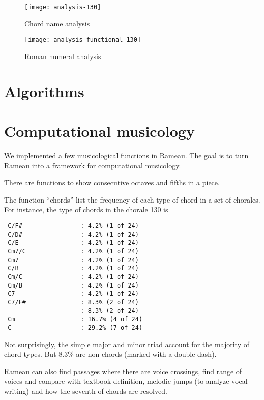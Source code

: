 \begin{figure}
  \centering
  \texttt{[image: analysis-130]}
  \caption{Chord name analysis}
  \label{fig:chord-name-analysis}
\end{figure}
\begin{figure}
  \centering
  \texttt{[image: analysis-functional-130]}  
  \caption{Roman numeral analysis}
  \label{fig:roman-analysis}
\end{figure}

\section{Algorithms}
\label{sec:algorithms}



\section{Computational musicology}
\label{sec:comp-music}


We implemented a few musicological functions in Rameau. The goal is to
turn Rameau into a framework for computational musicology. 

There are functions to show consecutive octaves and fifths in a piece.

The function ``chords'' list the frequency of each type of chord in a
set of chorales. For instance, the type of chords in the chorale 130
is

\begin{verbatim}
 C/F#                : 4.2% (1 of 24)
 C/D#                : 4.2% (1 of 24)
 C/E                 : 4.2% (1 of 24)
 Cm7/C               : 4.2% (1 of 24)
 Cm7                 : 4.2% (1 of 24)
 C/B                 : 4.2% (1 of 24)
 Cm/C                : 4.2% (1 of 24)
 Cm/B                : 4.2% (1 of 24)
 C7                  : 4.2% (1 of 24)
 C7/F#               : 8.3% (2 of 24)
 --                  : 8.3% (2 of 24)
 Cm                  : 16.7% (4 of 24)
 C                   : 29.2% (7 of 24)
\end{verbatim}

Not surprisingly, the simple major and minor triad account for the
majority of chord types. But 8.3\% are non-chords (marked with a
double dash).

Rameau can also find passages where there are voice crossings, find
range of voices and compare with textbook definition, melodic jumps
(to analyze vocal writing) and how the seventh of chords are resolved.

